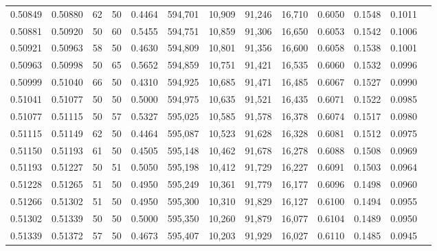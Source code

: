 \begin{tabular}{rrrrrrrrrrrrr}
0.50849 & 0.50880 &    62 &  50 &                                     0.4464 & 594,701 &  10,909 &  91,246 &  16,710 & 0.6050 & 0.1548 & 0.1011 \\
0.50881 & 0.50920 &    50 &  60 &                                     0.5455 & 594,751 &  10,859 &  91,306 &  16,650 & 0.6053 & 0.1542 & 0.1006 \\
0.50921 & 0.50963 &    58 &  50 &                                     0.4630 & 594,809 &  10,801 &  91,356 &  16,600 & 0.6058 & 0.1538 & 0.1001 \\
0.50963 & 0.50998 &    50 &  65 &                                     0.5652 & 594,859 &  10,751 &  91,421 &  16,535 & 0.6060 & 0.1532 & 0.0996 \\
0.50999 & 0.51040 &    66 &  50 &                                     0.4310 & 594,925 &  10,685 &  91,471 &  16,485 & 0.6067 & 0.1527 & 0.0990 \\
0.51041 & 0.51077 &    50 &  50 &                                     0.5000 & 594,975 &  10,635 &  91,521 &  16,435 & 0.6071 & 0.1522 & 0.0985 \\
0.51077 & 0.51115 &    50 &  57 &                                     0.5327 & 595,025 &  10,585 &  91,578 &  16,378 & 0.6074 & 0.1517 & 0.0980 \\
0.51115 & 0.51149 &    62 &  50 &                                     0.4464 & 595,087 &  10,523 &  91,628 &  16,328 & 0.6081 & 0.1512 & 0.0975 \\
0.51150 & 0.51193 &    61 &  50 &                                     0.4505 & 595,148 &  10,462 &  91,678 &  16,278 & 0.6088 & 0.1508 & 0.0969 \\
0.51193 & 0.51227 &    50 &  51 &                                     0.5050 & 595,198 &  10,412 &  91,729 &  16,227 & 0.6091 & 0.1503 & 0.0964 \\
0.51228 & 0.51265 &    51 &  50 &                                     0.4950 & 595,249 &  10,361 &  91,779 &  16,177 & 0.6096 & 0.1498 & 0.0960 \\
0.51266 & 0.51302 &    51 &  50 &                                     0.4950 & 595,300 &  10,310 &  91,829 &  16,127 & 0.6100 & 0.1494 & 0.0955 \\
0.51302 & 0.51339 &    50 &  50 &                                     0.5000 & 595,350 &  10,260 &  91,879 &  16,077 & 0.6104 & 0.1489 & 0.0950 \\
0.51339 & 0.51372 &    57 &  50 &                                     0.4673 & 595,407 &  10,203 &  91,929 &  16,027 & 0.6110 & 0.1485 & 0.0945 \\

\end{tabular}
